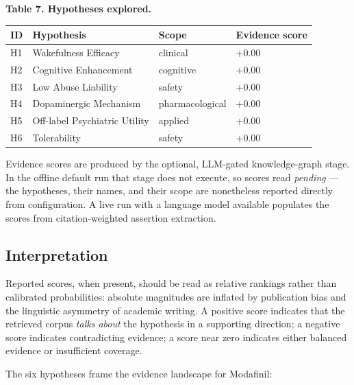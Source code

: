 \documentclass[
  english,
]{article}
\newcounter{none} %
\begin{document}
\textbf{Table 7. Hypotheses explored.}

{\def\LTcaptype{none} %
\begin{longtable}[]{@{}llll@{}}
\toprule\noalign{}
ID & Hypothesis & Scope & Evidence score \\
\midrule\noalign{}
\endhead
\bottomrule\noalign{}
\endlastfoot
H1 & Wakefulness Efficacy & clinical & +0.00 \\
H2 & Cognitive Enhancement & cognitive & +0.00 \\
H3 & Low Abuse Liability & safety & +0.00 \\
H4 & Dopaminergic Mechanism & pharmacological & +0.00 \\
H5 & Off-label Psychiatric Utility & applied & +0.00 \\
H6 & Tolerability & safety & +0.00 \\
\end{longtable}
}

Evidence scores are produced by the optional, LLM-gated knowledge-graph
stage. In the offline default run that stage does not execute, so scores
read \emph{pending} --- the hypotheses, their names, and their scope are
nonetheless reported directly from configuration. A live run with a
language model available populates the scores from citation-weighted
assertion extraction.

\subsection{Interpretation}\label{interpretation}

Reported scores, when present, should be read as relative rankings
rather than calibrated probabilities: absolute magnitudes are inflated
by publication bias and the linguistic asymmetry of academic writing. A
positive score indicates that the retrieved corpus \emph{talks about}
the hypothesis in a supporting direction; a negative score indicates
contradicting evidence; a score near zero indicates either balanced
evidence or insufficient coverage.

The six hypotheses frame the evidence landscape for Modafinil:
\end{document}
